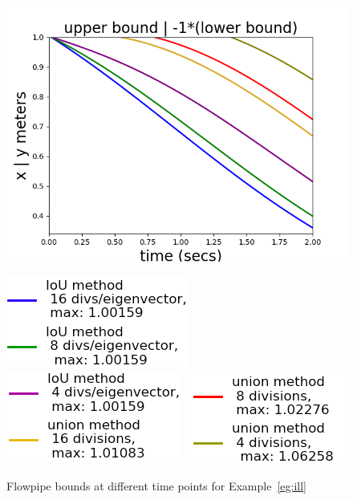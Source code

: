 \begin{figure}
{\center
  \includegraphics[scale = 0.5]{illImages/Ub.png}
  
  \includegraphics[scale = 0.41]{illImages/leg1.png}~
  \includegraphics[scale = 0.41]{illImages/leg2.png}~
  \includegraphics[scale = 0.41]{illImages/leg3.png}
  }
  \caption{Flowpipe bounds at different time points for
    Example~\ref{eg:ill}}
  \label{fig:ill}
\end{figure}
%
